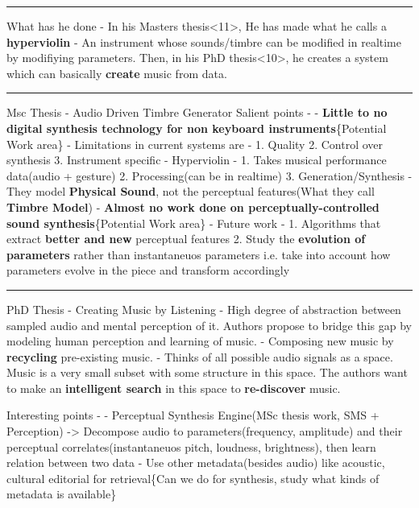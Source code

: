 \documentclass[11pt]{article}
\begin{document}
\begin{center}\rule{0.5\linewidth}{\linethickness}\end{center}

    What has he done - In his Masters thesis\textless{}11\textgreater{}, He
has made what he calls a \textbf{hyperviolin} - An instrument whose
sounds/timbre can be modified in realtime by modifiying parameters.
Then, in his PhD thesis\textless{}10\textgreater{}, he creates a system
which can basically \textbf{create} music from data.

    \begin{center}\rule{0.5\linewidth}{\linethickness}\end{center}

Msc Thesis - Audio Driven Timbre Generator Salient points - -
\textbf{Little to no digital synthesis technology for non keyboard
instruments}\{Potential Work area\} - Limitations in current systems are
- 1. Quality 2. Control over synthesis 3. Instrument specific -
Hyperviolin - 1. Takes musical performance data(audio + gesture) 2.
Processing(can be in realtime) 3. Generation/Synthesis - They model
\textbf{Physical Sound}, not the perceptual features(What they call
\textbf{Timbre Model}) - \textbf{Almost no work done on
perceptually-controlled sound synthesis}\{Potential Work area\} - Future
work - 1. Algorithms that extract \textbf{better and new} perceptual
features 2. Study the \textbf{evolution of parameters} rather than
instantaneuos parameters i.e. take into account how parameters evolve in
the piece and transform accordingly

    \begin{center}\rule{0.5\linewidth}{\linethickness}\end{center}

PhD Thesis - Creating Music by Listening - High degree of abstraction
between sampled audio and mental perception of it. Authors propose to
bridge this gap by modeling human perception and learning of music. -
Composing new music by \textbf{recycling} pre-existing music. - Thinks
of all possible audio signals as a space. Music is a very small subset
with some structure in this space. The authors want to make an
\textbf{intelligent search} in this space to \textbf{re-discover} music.

    Interesting points - - Perceptual Synthesis Engine(MSc thesis work, SMS
+ Perception) -\textgreater{} Decompose audio to parameters(frequency,
amplitude) and their perceptual correlates(instantaneuos pitch,
loudness, brightness), then learn relation between two data - Use other
metadata(besides audio) like acoustic, cultural editorial for
retrieval\{Can we do for synthesis, study what kinds of metadata is
available\}
\end{document}
